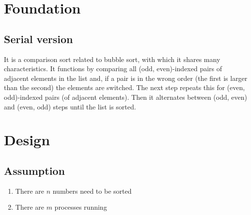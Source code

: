 \documentclass{article}
\begin{document}
\section {Foundation}
	\subsection{Serial version}
		\begin{Description}
			\item
				It is a comparison sort related to bubble sort,
				with which it shares many characteristics.
				It functions by comparing all (odd, even)-indexed
				pairs of adjacent elements in the list and,
				if a pair is in the wrong order (the first is
				larger than the second) the elements are switched.
				The next step repeats this for (even, odd)-indexed
				pairs (of adjacent elements). Then it alternates
				between (odd, even) and (even, odd) steps until
				the list is sorted.
		\end{Description}


\section{Design}
	\subsection{Assumption}
		\begin{enumerate}
			\item
				There are $n$ numbers need to be sorted
			\item
				There are $m$ processes running
		\end{enumerate}
\end{document}
